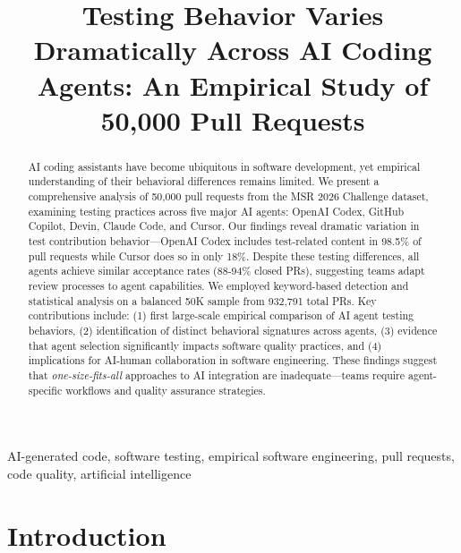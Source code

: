 \documentclass[conference]{IEEEtran}
\begin{document}
\title{Testing Behavior Varies Dramatically Across AI Coding Agents: An Empirical Study of 50,000 Pull Requests}

\author{
}

\maketitle

\begin{abstract}
AI coding assistants have become ubiquitous in software development, yet empirical understanding of their behavioral differences remains limited. We present a comprehensive analysis of 50,000 pull requests from the MSR 2026 Challenge dataset, examining testing practices across five major AI agents: OpenAI Codex, GitHub Copilot, Devin, Claude Code, and Cursor. Our findings reveal dramatic variation in test contribution behavior---OpenAI Codex includes test-related content in 98.5\% of pull requests while Cursor does so in only 18\%. Despite these testing differences, all agents achieve similar acceptance rates (88-94\% closed PRs), suggesting teams adapt review processes to agent capabilities. We employed keyword-based detection and statistical analysis on a balanced 50K sample from 932,791 total PRs. Key contributions include: (1) first large-scale empirical comparison of AI agent testing behaviors, (2) identification of distinct behavioral signatures across agents, (3) evidence that agent selection significantly impacts software quality practices, and (4) implications for AI-human collaboration in software engineering. These findings suggest that \textit{one-size-fits-all} approaches to AI integration are inadequate---teams require agent-specific workflows and quality assurance strategies.
\end{abstract}

\begin{IEEEkeywords}
AI-generated code, software testing, empirical software engineering, pull requests, code quality, artificial intelligence
\end{IEEEkeywords}

\section{Introduction}
\end{document}
